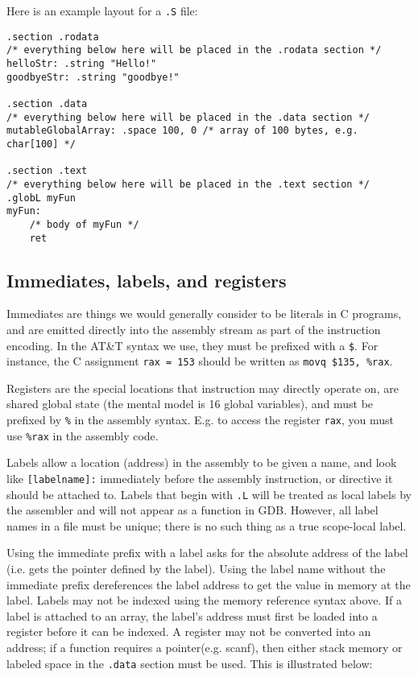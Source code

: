 \documentclass[11pt]{article}
\begin{document}
Here is an example layout for a \texttt{.S} file:

\begin{lstlisting}
.section .rodata
/* everything below here will be placed in the .rodata section */
helloStr: .string "Hello!"
goodbyeStr: .string "goodbye!"

.section .data
/* everything below here will be placed in the .data section */
mutableGlobalArray: .space 100, 0 /* array of 100 bytes, e.g. char[100] */

.section .text
/* everything below here will be placed in the .text section */
.globL myFun
myFun:
    /* body of myFun */
    ret
\end{lstlisting}

\subsection{Immediates, labels, and registers}

Immediates are things we would generally consider to be literals in C programs, and are
emitted directly into the assembly stream as part of the instruction encoding. In the
AT\&T syntax we use, they must be prefixed with a \texttt{\$}. For instance, the C
assignment \texttt{rax = 153} should be written as \texttt{movq \$135, \%rax}.

Registers are the special locations that instruction may directly operate on, are shared
global state (the mental model is 16 global variables), and must be prefixed by
\texttt{\%} in the assembly syntax. E.g. to access the register \texttt{rax}, you must use
\texttt{\%rax} in the assembly code.

Labels allow a location (address) in the assembly to be given a name, and look like
\texttt{[labelname]:} immediately before the assembly instruction, or directive it should
be attached to. Labels that begin with \texttt{.L} will be treated as local labels by the
assembler and will not appear as a function in GDB. However, all label names in a file
must be unique; there is no such thing as a true scope-local label.

Using the immediate prefix with a label asks for the absolute address of the label (i.e.
gets the pointer defined by the label). Using the label name without the immediate prefix
dereferences the label address to get the value in memory at the label. Labels may not be
indexed using the memory reference syntax above. If a label is attached to an array, the
label's address must first be loaded into a register before it can be indexed. A register
may not be converted into an address; if a function requires a pointer(e.g. scanf), then
either stack memory or labeled space in the \texttt{.data} section must be used. This is
illustrated below:
\end{document}
